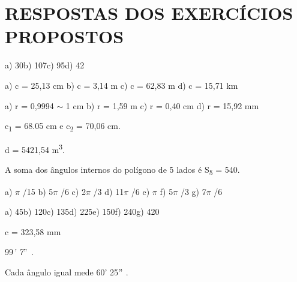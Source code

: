 \section{RESPOSTAS DOS EXERCÍCIOS PROPOSTOS}

\begin{respostas}{2}
\ansitem{} a) 30\degree \tab b) 107\degree  \tab    c) 95\degree  \tab    d) 42\degree

\ansitem{} a) c = 25,13 cm \tab  b) c = 3,14 m \tab c) c = 62,83 m \tab d) c = 15,71 km

\ansitem{} a) r = 0,9994 $ \sim $  1 cm \tab b)  r = 1,59 m \tab c)  r = 0,40 cm  \tab d) r = 15,92 mm

\ansitem{} c\textsubscript{1} = 68.05 cm e c\textsubscript{2} = 70,06 cm.

\ansitem{} d = 5421,54 m\textsuperscript{3}.

\ansitem{}  A soma dos ângulos internos do polígono de 5 lados é S\textsubscript{5} = 540\degree.   

\ansitem{} a) $ \pi $ /15 \tab b) 5$ \pi $ /6    \tab c) 2$ \pi $ /3   \tab d) 11$ \pi $ /6      \tab e) $ \pi $      f) 5$ \pi $ /3      \tab g) 7$ \pi $ /6  

\ansitem{} a) 45\degree \tab b) 120\degree \tab c) 135\degree \tab d) 225\degree \tab e) 150\degree  \tab    f) 240\degree \tab g) 420\degree

\ansitem{} c = 323,58 mm

\ansitem{}   99\textit{’ 7$"$  . }

\ansitem{} Cada ângulo igual mede 60’ 25$"$ .

\ansitem{}


\end{respostas}

